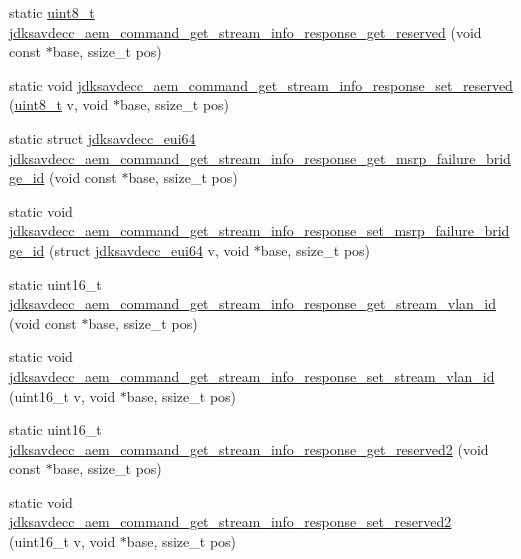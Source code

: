 \begin{DoxyCompactItemize}
\item 
static \hyperlink{stdint_8h_aba7bc1797add20fe3efdf37ced1182c5}{uint8\+\_\+t} \hyperlink{group__command__get__stream__info__response_ga37141f0ce790f9f64ba2111594590bcb}{jdksavdecc\+\_\+aem\+\_\+command\+\_\+get\+\_\+stream\+\_\+info\+\_\+response\+\_\+get\+\_\+reserved} (void const $\ast$base, ssize\+\_\+t pos)
\item 
static void \hyperlink{group__command__get__stream__info__response_ga74780a919f6ff23fc9b66453700abd57}{jdksavdecc\+\_\+aem\+\_\+command\+\_\+get\+\_\+stream\+\_\+info\+\_\+response\+\_\+set\+\_\+reserved} (\hyperlink{stdint_8h_aba7bc1797add20fe3efdf37ced1182c5}{uint8\+\_\+t} v, void $\ast$base, ssize\+\_\+t pos)
\item 
static struct \hyperlink{structjdksavdecc__eui64}{jdksavdecc\+\_\+eui64} \hyperlink{group__command__get__stream__info__response_gab22add0a1e19a8f215ba0a92cb01a247}{jdksavdecc\+\_\+aem\+\_\+command\+\_\+get\+\_\+stream\+\_\+info\+\_\+response\+\_\+get\+\_\+msrp\+\_\+failure\+\_\+bridge\+\_\+id} (void const $\ast$base, ssize\+\_\+t pos)
\item 
static void \hyperlink{group__command__get__stream__info__response_ga32f1771b5fecea142206909a4e7d7251}{jdksavdecc\+\_\+aem\+\_\+command\+\_\+get\+\_\+stream\+\_\+info\+\_\+response\+\_\+set\+\_\+msrp\+\_\+failure\+\_\+bridge\+\_\+id} (struct \hyperlink{structjdksavdecc__eui64}{jdksavdecc\+\_\+eui64} v, void $\ast$base, ssize\+\_\+t pos)
\item 
static uint16\+\_\+t \hyperlink{group__command__get__stream__info__response_gab5999235219bc06614133a9a61098cc7}{jdksavdecc\+\_\+aem\+\_\+command\+\_\+get\+\_\+stream\+\_\+info\+\_\+response\+\_\+get\+\_\+stream\+\_\+vlan\+\_\+id} (void const $\ast$base, ssize\+\_\+t pos)
\item 
static void \hyperlink{group__command__get__stream__info__response_ga7d6e13c4f3aacb930ad923c95e58f71b}{jdksavdecc\+\_\+aem\+\_\+command\+\_\+get\+\_\+stream\+\_\+info\+\_\+response\+\_\+set\+\_\+stream\+\_\+vlan\+\_\+id} (uint16\+\_\+t v, void $\ast$base, ssize\+\_\+t pos)
\item 
static uint16\+\_\+t \hyperlink{group__command__get__stream__info__response_ga7788b2f53bac2826facefbac32e10572}{jdksavdecc\+\_\+aem\+\_\+command\+\_\+get\+\_\+stream\+\_\+info\+\_\+response\+\_\+get\+\_\+reserved2} (void const $\ast$base, ssize\+\_\+t pos)
\item 
static void \hyperlink{group__command__get__stream__info__response_ga3fa8fbd9bb141a344e6cd0f3812f8300}{jdksavdecc\+\_\+aem\+\_\+command\+\_\+get\+\_\+stream\+\_\+info\+\_\+response\+\_\+set\+\_\+reserved2} (uint16\+\_\+t v, void $\ast$base, ssize\+\_\+t pos)

\end{DoxyCompactItemize}
